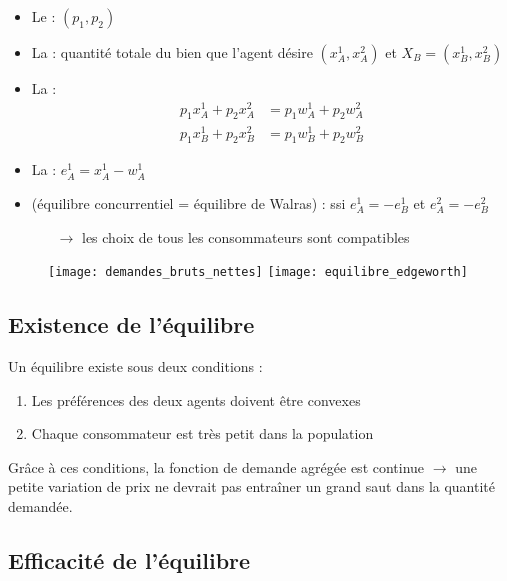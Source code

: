 \begin{itemize}
\item Le  : $(p_1,p_2)$
\item La  : quantité totale du bien que l'agent désire $(x_A^1, x_A^2)$ et $X_B = (x_B^1,x_B^2)$
\item La  :
\begin{align*}
p_1 x_A^1 + p_2 x_A^2 &= p_1 w_A^1 + p_2 w_A^2\\
p_1 x_B^1 + p_2 x_B^2 &= p_1 w_B^1 + p_2 w_B^2
\end{align*}
\item La  : $e_A^1 = x_A^1 - w_A^1$
\item {} (équilibre concurrentiel = équilibre de Walras) : ssi $e_A^1 = -e_B^1$ et $e_A^2 = -e_B^2$
\begin{itemize}
\item[$\rightarrow$] les choix de tous les consommateurs sont compatibles
\end{itemize}
\end{itemize}
\begin{figure}[H]
	\centering
	\texttt{[image: demandes\_bruts\_nettes]}\hfill
	\texttt{[image: equilibre\_edgeworth]}
\end{figure}

\subsection{Existence de l'équilibre}

Un équilibre existe sous deux conditions :
\begin{enumerate}
\item Les préférences des deux agents doivent être convexes
\item Chaque consommateur est très petit dans la population
\end{enumerate}
Grâce à ces conditions, la fonction de demande agrégée est continue $\rightarrow$ une petite variation de prix ne devrait pas entraîner un grand saut dans la quantité demandée.


\subsection{Efficacité de l'équilibre}

